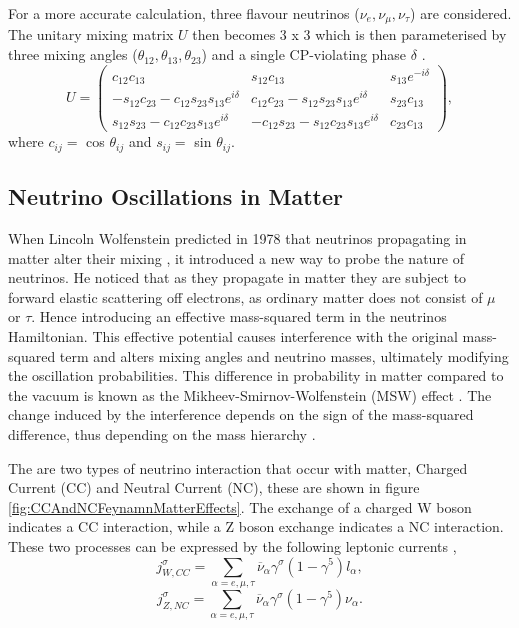 For a more accurate calculation, three flavour neutrinos ($\nu_{e}, \nu_{\mu}, \nu_{\tau}$) are considered. The unitary mixing matrix $U$ then becomes 3 x 3 which is then parameterised by three mixing angles ($\theta_{12}, \theta_{13}, \theta_{23}$) and a single CP-violating phase $\delta$ \cite{georgeThesis}. 
\begin{equation}
U =  \left( \begin{array}{ccc}
c_{12}c_{13} & s_{12}c_{13} & s_{13}e^{-i\delta} \\
-s_{12}c_{23} - c_{12}s_{23}s_{13}e^{i\delta} & c_{12}c_{23} - s_{12}s_{23}s_{13}e^{i\delta} & s_{23}c_{13} \\
s_{12}s_{23} - c_{12}c_{23}s_{13}e^{i\delta} & -c_{12}s_{23} - s_{12}c_{23}s_{13}e^{i\delta} & c_{23}c_{13}
\label{ar: matrix}
 \end{array} \right),
 \end{equation}
 where $c_{ij} = $ cos $ \theta_{ij}$ and $s_{ij} = $ sin $ \theta_{ij}$.
 
\subsection{Neutrino Oscillations in Matter}
When Lincoln Wolfenstein predicted in 1978 that neutrinos propagating in matter alter their mixing \cite{wolfensteinMatterOscillations}, it introduced a new way to probe the nature of neutrinos. He noticed that as they propagate in matter they are subject to forward elastic scattering off electrons, as ordinary matter does not consist of $\mu$ or $\tau$. Hence introducing an effective mass-squared term in the neutrinos Hamiltonian. This effective potential causes interference with the original mass-squared term and alters mixing angles and neutrino masses, ultimately modifying the oscillation probabilities. This difference in probability in matter compared to the vacuum is known as the Mikheev-Smirnov-Wolfenstein (MSW) effect \cite{MSWeffect}. The change induced by the interference depends on the sign of the mass-squared difference, thus depending on the mass hierarchy \cite{magicBaseline1}.

The are two types of neutrino interaction that occur with matter, Charged Current (CC) and Neutral Current (NC), these are shown in figure \ref{fig:CCAndNCFeynamnMatterEffects}. The exchange of a charged W boson indicates a CC interaction, while a Z boson exchange indicates a NC interaction. These two processes can be expressed by the following leptonic currents \cite{giuntiNeutrino},
\begingroup
  \addtolength{}%
  \addtolength{}%
 \addtolength{}%
 \addtolength{}%
\begin{equation}
j_{W,CC}^{\sigma} = \sum_{\alpha=e,\mu,\tau}\overline{\nu}_{\alpha}\gamma^{\sigma}(1-\gamma^{5})l_{\alpha},
\end{equation}
\begin{equation}
j_{Z,NC}^{\sigma} = \sum_{\alpha=e,\mu,\tau}\overline{\nu}_{\alpha}\gamma^{\sigma}(1-\gamma^{5})\nu_{\alpha}.
\end{equation}
\endgroup


